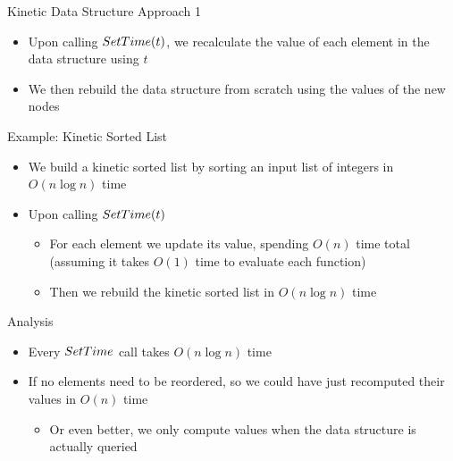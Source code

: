 \documentclass[aspectratio=169, handout]{beamer}
\begin{document}
\begin{frame}{Kinetic Data Structure Approach 1}
    \begin{itemize}
        \item Upon calling $\emph{SetTime}(t)$, we recalculate the value of each element in the data structure using $t$
        \item We then rebuild the data structure from scratch using the values of the new nodes
    \end{itemize}
\end{frame}

\begin{frame}{Example: Kinetic Sorted List}
    \begin{itemize}
        \item We build a kinetic sorted list by sorting an input list of integers in $O(n \log n)$ time
        \item Upon calling $\emph{SetTime}(t)$
        \begin{itemize}
            \item For each element we update its value, spending $O(n)$ time total (assuming it takes $O(1)$ time to evaluate each function)
            \item Then we rebuild the kinetic sorted list in $O(n \log n)$ time
        \end{itemize}
    \end{itemize}
\end{frame}

\begin{frame}{Analysis}
    \begin{itemize}
        \item Every $\emph{SetTime}$ call takes $O(n \log n)$ time
        \item If no elements need to be reordered, so we could have just recomputed their values in $O(n)$ time
        \begin{itemize}
            \item Or even better, we only compute values when the data structure is actually queried
        \end{itemize}
    \end{itemize}
\end{frame}
\end{document}
